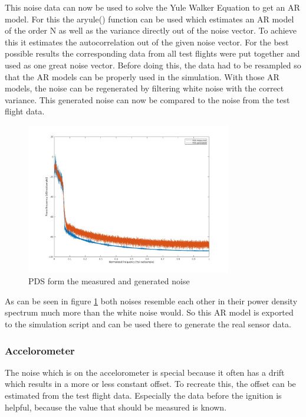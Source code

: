 This noise data can now be used to solve the Yule Walker Equation to get an AR model.
For this the aryule() function can be used which estimates an AR model of the order N as well as the variance directly out of the noise vector.
To achieve this it estimates the autocorrelation out of the given noise vector.
For the best possible results the corresponding data from all test flights were put together and used as one great noise vector.
Before doing this, the data had to be resampled so that the AR models can be properly used in the simulation.
With those AR models, the noise can be regenerated by filtering white noise with the correct variance.
This generated noise can now be compared to the noise from the test flight data.

\begin{figure}[h!]
 \centering
 \includegraphics[width=0.8\textwidth]{./Pictures/PDSnoise.jpg}
 \caption{PDS form the measured and generated noise}
 \label{fig:PDSNoise}
\end{figure}


As can be seen in figure \ref{fig:PDSNoise} both noises resemble each other in their power density spectrum much more than the white noise would.
So this AR model is exported to the simulation script and can be used there to generate the real sensor data.

\subsubsection{Accelorometer}
The noise which is on the accelorometer is special because it often has a drift which results in a more or less constant offset.
To recreate this, the offset can be estimated from the test flight data.
Especially the data before the ignition is helpful, because the value that should be measured is known.

